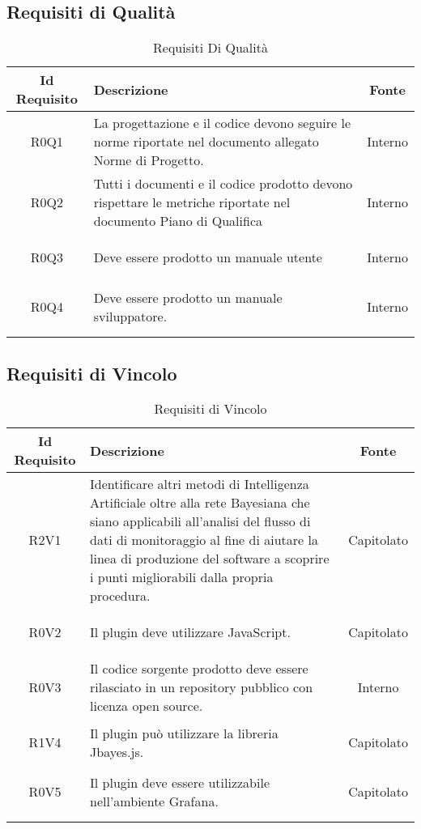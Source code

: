 \subsection{Requisiti di Qualità}
\normalsize
\begin{longtable}{|c|H|c|}
	\hline
	\textbf{Id Requisito} & \textbf{Descrizione} & \textbf{Fonte}\\
	\hline
	\endhead
	\hypertarget{R0Q1}{R0Q1} & La progettazione e il codice devono seguire le norme riportate nel documento allegato Norme di Progetto. & Interno \\ \hline 
	\hypertarget{R0Q2}{R0Q2} & Tutti i documenti e il codice prodotto devono rispettare le metriche riportate nel documento Piano di Qualifica & Interno \\ \hline 
	\hypertarget{R0Q3}{R0Q3} & Deve essere prodotto un manuale utente & Interno \\ \hline 
	\hypertarget{R0Q4}{R0Q4} & Deve essere prodotto un manuale sviluppatore. & Interno \\ \hline 
	\caption[Requisiti di Qualità]{Requisiti Di Qualità}
	\label{tabella:req1}
\end{longtable}
\clearpage
{}
\subsection{Requisiti di Vincolo}
\normalsize
\begin{longtable}{|c|H|c|}
	\hline
	\textbf{Id Requisito} & \textbf{Descrizione} & \textbf{Fonte}\\
	\hline
	\endhead
	\hypertarget{R2V1}{R2V1} & Identificare altri metodi di Intelligenza Artificiale oltre alla rete Bayesiana che siano applicabili all’analisi del flusso di dati di monitoraggio al fine di aiutare la linea di produzione del software a scoprire i punti migliorabili dalla propria procedura. & Capitolato  \\ \hline 
	\hypertarget{R0V2}{R0V2} & Il plugin deve utilizzare JavaScript. & Capitolato  \\ \hline 
	\hypertarget{R0V3}{R0V3} & Il codice sorgente prodotto deve essere rilasciato in un repository pubblico con licenza open source. & Interno  \\ \hline 
	\hypertarget{R1V4}{R1V4} & Il plugin può utilizzare la libreria Jbayes.js. & Capitolato  \\ \hline 
	\hypertarget{R0V5}{R0V5} & Il plugin deve essere utilizzabile nell’ambiente Grafana. & Capitolato  \\ \hline 
	\caption[Requisiti Di Vincolo]{Requisiti di Vincolo}
	\label{tabella:req3}
\end{longtable}
\clearpage



